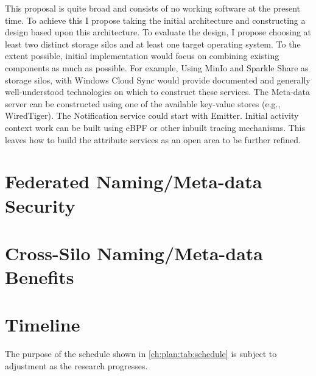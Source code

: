This proposal is quite broad and consists of no working software at the present
time.  To achieve this I propose taking the initial architecture and
constructing
a design based upon this architecture.  To evaluate the design, I
propose choosing at least two distinct storage silos and at least one target
operating system.  To the extent possible, initial implementation would focus on
combining existing components as much as possible.  For example, Using MinIo and
Sparkle Share as storage silos, with Windows Cloud Sync would provide documented
and generally well-understood technologies on which to construct these
services.
The Meta-data server can be constructed using one of the available key-value
stores (e.g., WiredTiger).  The Notification service could start with Emitter.
Initial activity context work can be built using eBPF or other inbuilt tracing
mechanisms.  This leaves how to build the attribute services as an open area to
be further refined.


\section{Federated Naming/Meta-data Security}
\label{ch:plan:sec:federated-naming-security}


\section{Cross-Silo Naming/Meta-data Benefits}
\label{ch:plan:sec:cross-silo-naming-benefits}


\section{Timeline}
\label{ch:plan:sec:timeline}



The purpose of the schedule shown in \autoref{ch:plan:tab:schedule} is subject to adjustment as the research
progresses.

